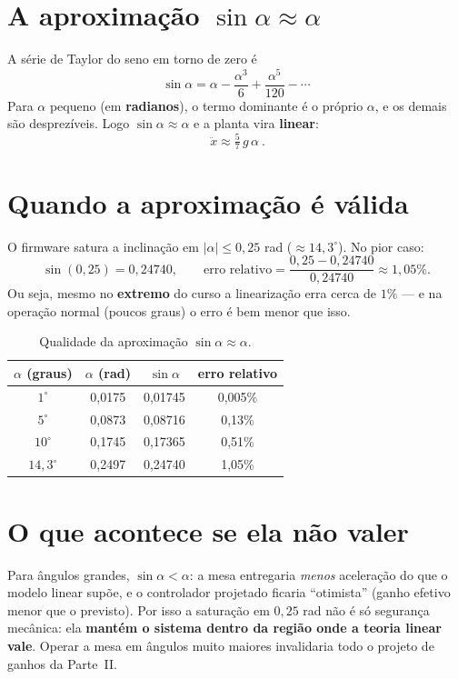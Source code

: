 \section{A aproxima\c{c}\~ao $\sin\alpha \approx \alpha$}
A s\'erie de Taylor do seno em torno de zero \'e
\begin{equation}
\sin\alpha = \alpha - \frac{\alpha^3}{6} + \frac{\alpha^5}{120} - \cdots
\end{equation}
Para $\alpha$ pequeno (em \textbf{radianos}), o termo dominante \'e o pr\'oprio
$\alpha$, e os demais s\~ao desprez\'iveis. Logo $\sin\alpha\approx\alpha$ e a
planta vira \textbf{linear}:
\begin{equation}
\boxed{\ \ddot{x} \approx \tfrac{5}{7}\,g\,\alpha \ } .
\label{eq:planta-lin}
\end{equation}

\section{Quando a aproxima\c{c}\~ao \'e v\'alida}
\begin{exemplo}
O firmware satura a inclina\c{c}\~ao em $|\alpha|\le 0{,}25$ rad ($\approx14{,}3^\circ$).
No pior caso:
\[
\sin(0{,}25)=0{,}24740,\qquad \text{erro relativo} = \frac{0{,}25-0{,}24740}{0{,}24740}
\approx 1{,}05\%.
\]
Ou seja, mesmo no \textbf{extremo} do curso a lineariza\c{c}\~ao erra cerca de
$1\%$ --- e na opera\c{c}\~ao normal (poucos graus) o erro \'e bem menor que isso.
\end{exemplo}

\begin{table}[h]\centering
\caption{Qualidade da aproxima\c{c}\~ao $\sin\alpha\approx\alpha$.}
\label{tab:lin}
\begin{tabular}{cccc}
\toprule
$\alpha$ (graus) & $\alpha$ (rad) & $\sin\alpha$ & erro relativo \\
\midrule
$1^\circ$  & 0,0175 & 0,01745 & 0,005\% \\
$5^\circ$  & 0,0873 & 0,08716 & 0,13\% \\
$10^\circ$ & 0,1745 & 0,17365 & 0,51\% \\
$14{,}3^\circ$ & 0,2497 & 0,24740 & 1,05\% \\
\bottomrule
\end{tabular}
\end{table}

\section{O que acontece se ela n\~ao valer}
\begin{atencao}
Para \^angulos grandes, $\sin\alpha < \alpha$: a mesa entregaria \emph{menos}
acelera\c{c}\~ao do que o modelo linear sup\~oe, e o controlador projetado ficaria
``otimista'' (ganho efetivo menor que o previsto). Por isso a satura\c{c}\~ao em
$0{,}25$ rad n\~ao \'e s\'o seguran\c{c}a mec\^anica: ela \textbf{mant\'em o
sistema dentro da regi\~ao onde a teoria linear vale}. Operar a mesa em \^angulos
muito maiores invalidaria todo o projeto de ganhos da Parte~II.
\end{atencao}


